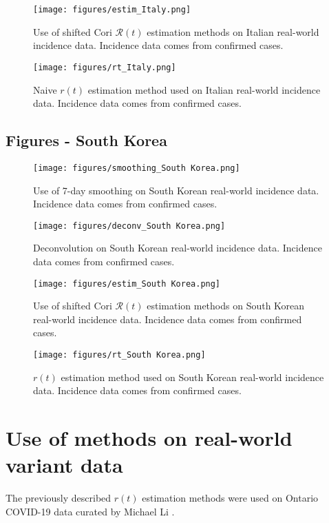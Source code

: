 \documentclass{article}
\newcommand{\nR}{\mathcal{R}}
\newcommand{\nr}{r}
\begin{document}
\begin{figure}[h!]
    \centering
    \texttt{[image: figures/estim\_Italy.png]}
    \caption{Use of shifted Cori $\nR(t)$ estimation methods on Italian real-world incidence data. Incidence data comes from confirmed cases.}
    \label{fig:my_label}
\end{figure}

\clearpage
\begin{figure}[h!]
    \centering
    \texttt{[image: figures/rt\_Italy.png]}
    \caption{Naive $\nr(t)$ estimation method used on Italian real-world incidence data. Incidence data comes from confirmed cases.}
    \label{fig:my_label}
\end{figure}

\clearpage
\subsection{Figures - South Korea}
\begin{figure}[h!]
    \centering
    \texttt{[image: figures/smoothing\_South Korea.png]}
    \caption{Use of 7-day smoothing on South Korean real-world incidence data. Incidence data comes from confirmed cases.}
    \label{fig:my_label}
\end{figure}

\begin{figure}
    \centering
    \texttt{[image: figures/deconv\_South Korea.png]}
    \caption{Deconvolution on South Korean real-world incidence data. Incidence data comes from confirmed cases.}
    \label{fig:my_label}
\end{figure}

\begin{figure}[h!]
    \centering
    \texttt{[image: figures/estim\_South Korea.png]}
    \caption{Use of shifted Cori $\nR(t)$ estimation methods on South Korean real-world incidence data. Incidence data comes from confirmed cases.}
    \label{fig:my_label}
\end{figure}

\clearpage
\begin{figure}[h!]
    \centering
    \texttt{[image: figures/rt\_South Korea.png]}
    \caption{$\nr(t)$ estimation method used on South Korean real-world incidence data. Incidence data comes from confirmed cases.}
    \label{fig:my_label}
\end{figure}

\section{Use of methods on real-world variant data}
The previously described $\nr(t)$ estimation methods were used on Ontario COVID-19 data curated by Michael Li \cite{mli}. 
\end{document}
